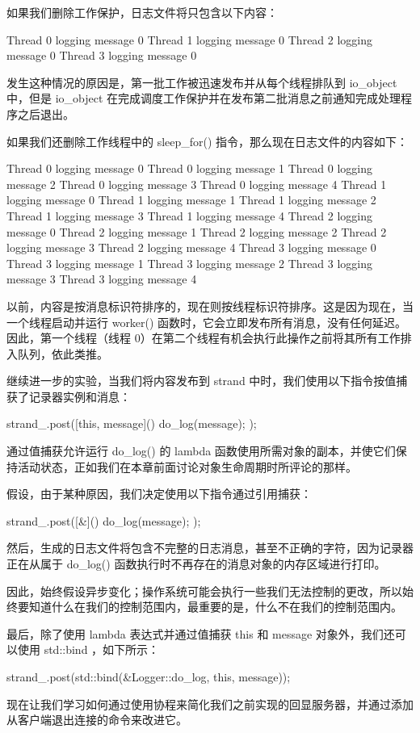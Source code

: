 如果我们删除工作保护，日志文件将只包含以下内容：

\begin{shell}
Thread 0 logging message 0
Thread 1 logging message 0
Thread 2 logging message 0
Thread 3 logging message 0
\end{shell}

发生这种情况的原因是，第一批工作被迅速发布并从每个线程排队到 io\_object 中，但是 io\_object 在完成调度工作保护并在发布第二批消息之前通知完成处理程序之后退出。

如果我们还删除工作线程中的 sleep\_for() 指令，那么现在日志文件的内容如下：

\begin{shell}
Thread 0 logging message 0
Thread 0 logging message 1
Thread 0 logging message 2
Thread 0 logging message 3
Thread 0 logging message 4
Thread 1 logging message 0
Thread 1 logging message 1
Thread 1 logging message 2
Thread 1 logging message 3
Thread 1 logging message 4
Thread 2 logging message 0
Thread 2 logging message 1
Thread 2 logging message 2
Thread 2 logging message 3
Thread 2 logging message 4
Thread 3 logging message 0
Thread 3 logging message 1
Thread 3 logging message 2
Thread 3 logging message 3
Thread 3 logging message 4
\end{shell}

以前，内容是按消息标识符排序的，现在则按线程标识符排序。这是因为现在，当一个线程启动并运行 worker() 函数时，它会立即发布所有消息，没有任何延迟。因此，第一个线程（线程 0）在第二个线程有机会执行此操作之前将其所有工作排入队列，依此类推。

继续进一步的实验，当我们将内容发布到 strand 中时，我们使用以下指令按值捕获了记录器实例和消息：

\begin{cpp}
strand_.post([this, message]() { do_log(message); });
\end{cpp}

通过值捕获允许运行 do\_log() 的 lambda 函数使用所需对象的副本，并使它们保持活动状态，正如我们在本章前面讨论对象生命周期时所评论的那样。

假设，由于某种原因，我们决定使用以下指令通过引用捕获：

\begin{cpp}
strand_.post([&]() { do_log(message); });
\end{cpp}

然后，生成的日志文件将包含不完整的日志消息，甚至不正确的字符，因为记录器正在从属于 do\_log() 函数执行时不再存在的消息对象的内存区域进行打印。

因此，始终假设异步变化；操作系统可能会执行一些我们无法控制的更改，所以始终要知道什么在我们的控制范围内，最重要的是，什么不在我们的控制范围内。

最后，除了使用 lambda 表达式并通过值捕获 this 和 message 对象外，我们还可以使用 std::bind ，如下所示：

\begin{cpp}
strand_.post(std::bind(&Logger::do_log, this, message));
\end{cpp}

现在让我们学习如何通过使用协程来简化我们之前实现的回显服务器，并通过添加从客户端退出连接的命令来改进它。



















